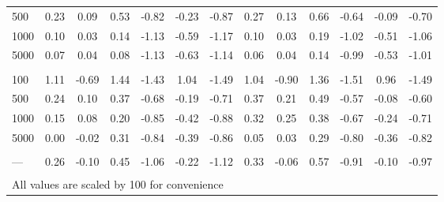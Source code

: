 \documentclass[AMA,STIX1COL,doublespace]{WileyNJD-v2}
\begin{document}
\begin{table}
\begin{tabular}[t]{lcccccccccccc}
\hspace{1em}500 & 0.23 & 0.09 & 0.53 & -0.82 & -0.23 & -0.87 & 0.27 & 0.13 & 0.66 & -0.64 & -0.09 & -0.70\\
\hspace{1em}1000 & 0.10 & 0.03 & 0.14 & -1.13 & -0.59 & -1.17 & 0.10 & 0.03 & 0.19 & -1.02 & -0.51 & -1.06\\
\hspace{1em}5000 & 0.07 & 0.04 & 0.08 & -1.13 & -0.63 & -1.14 & 0.06 & 0.04 & 0.14 & -0.99 & -0.53 & -1.01\\
\addlinespace[0.75em]
\multicolumn{13}{l}{\textbf{10 predictors, 490 junk}}\\
\hline
\hspace{1em}100 & 1.11 & -0.69 & 1.44 & -1.43 & 1.04 & -1.49 & 1.04 & -0.90 & 1.36 & -1.51 & 0.96 & -1.49\\
\hspace{1em}500 & 0.24 & 0.10 & 0.37 & -0.68 & -0.19 & -0.71 & 0.37 & 0.21 & 0.49 & -0.57 & -0.08 & -0.60\\
\hspace{1em}1000 & 0.15 & 0.08 & 0.20 & -0.85 & -0.42 & -0.88 & 0.32 & 0.25 & 0.38 & -0.67 & -0.24 & -0.71\\
\hspace{1em}5000 & 0.00 & -0.02 & 0.31 & -0.84 & -0.39 & -0.86 & 0.05 & 0.03 & 0.29 & -0.80 & -0.36 & -0.82\\
\addlinespace[0.75em]
\multicolumn{13}{l}{\textbf{Overall}}\\
\hline
\hspace{1em}--- & 0.26 & -0.10 & 0.45 & -1.06 & -0.22 & -1.12 & 0.33 & -0.06 & 0.57 & -0.91 & -0.10 & -0.97\\
\bottomrule
\multicolumn{13}{l}{\textsuperscript{} All values are scaled by 100 for convenience}\\
\end{tabular}
\end{table}
\end{document}
